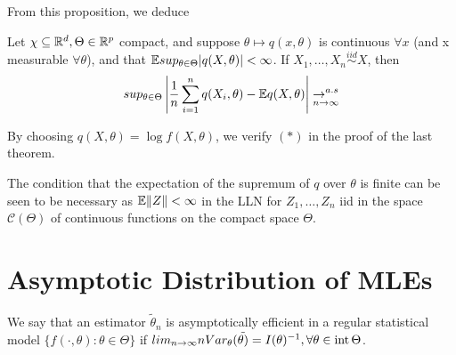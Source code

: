 \documentclass[a4paper]{article}
\begin{document}
From this proposition, we deduce

\begin{prop}
	Let $\chi \subseteq \mathbb{R}^{d}, \Theta \in \mathbb{R}^{p}$ compact, and suppose $\theta \mapsto q(x, \theta)$ is continuous  $\forall x$ (and x measurable $\forall \theta$), and that  $\mathbb{E} sup_{\theta \in \Theta} |q(X, \theta)| < \infty$. If $X_1, \ldots, X_n \stackrel{iid}{\sim} X$, then
	\[
		sup_{\theta \in \Theta} \left| \frac{1}{n} \sum_{i=1}^{n} q(X_i, \theta) - \mathbb{E} q(X, \theta) \right| \underset{n \to  \infty}{\to ^{a.s}}
	\]
\end{prop}

\begin{remark}
	By choosing $q(X, \theta) = \log f(X,\theta)$, we verify $(\ast)$ in the proof of the last theorem.
	
\end{remark}

\begin{remark}
	The condition that the expectation of the supremum of $q$ over $\theta$ is finite can be seen to be necessary as $\mathbb{E} \|Z\|< \infty$ in the LLN for $Z_1, \ldots, Z_n$ iid in the space $\mathcal{C}(\Theta)$ of continuous functions on the compact space $\Theta$.
\end{remark}

\section{Asymptotic Distribution of MLEs}

\begin{defn}
	We say that an estimator $\tilde{\theta}_n$ is asymptotically efficient in a regular statistical model $\{f\left( \cdot , \theta \right) : \theta \in \Theta \}$ if $lim_{n\to \infty} n Var_{\theta} (\tilde{\theta)} = I(\theta)^{-1}, \forall \theta \in\operatorname{int}\Theta$.
\end{defn}

\newpage
\end{document}
